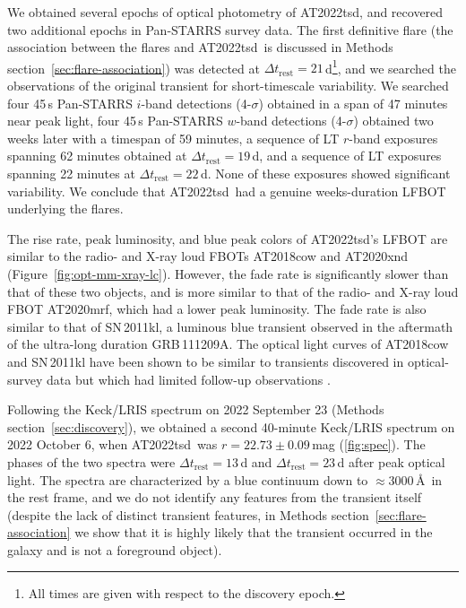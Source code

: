 \documentclass{nature_plusfigure}
\newcommand{\at}{AT2022tsd}
\begin{document}
\begin{methods}
We obtained several epochs of optical photometry of \at, and recovered two additional epochs in Pan-STARRS survey data.
The first definitive flare (the association between the flares and \at\ is discussed in Methods section~\ref{sec:flare-association}) was detected at $\Delta t_\mathrm{rest}=21$\,d\footnote{All times are given with respect to the discovery epoch.}, and we searched the observations of the original transient for short-timescale variability.
We searched four 45\,s Pan-STARRS $i$-band detections (4-$\sigma$) obtained in a span of 47 minutes near peak light,
four 45\,s Pan-STARRS $w$-band detections (4-$\sigma$) obtained two weeks later with a timespan of 59 minutes,
a sequence of LT $r$-band exposures spanning 62 minutes obtained at $\Delta t_\mathrm{rest}=19\,$d,
and a sequence of LT exposures spanning 22 minutes at $\Delta t_\mathrm{rest}=22$\,d.
None of these exposures showed significant variability.
We conclude that \at\ had a genuine weeks-duration LFBOT underlying the flares.

The rise rate, peak luminosity, and blue peak colors of \at's LFBOT are similar to the radio- and X-ray loud FBOTs AT2018cow and AT2020xnd (Figure~\ref{fig:opt-mm-xray-lc}). However, the fade rate is significantly slower than that of these two objects, and is more similar to that of the radio- and X-ray loud FBOT AT2020mrf\cite{Yao2022}, which had a lower peak luminosity. The fade rate is also similar to that of SN\,2011kl, a luminous blue transient observed in the aftermath of the ultra-long duration GRB\,111209A\cite{Greiner2015}.
The optical light curves of AT2018cow and SN\,2011kl have been shown to be similar to transients discovered in optical-survey data but which had limited follow-up observations \cite{Arcavi2016,Pursiainen2018,Drout2014}.

Following the Keck/LRIS spectrum on 2022 September 23 (Methods section~\ref{sec:discovery}), we obtained a second 40-minute Keck/LRIS spectrum on 2022 October 6, when \at\ was $r=22.73\pm0.09\,$mag (\ref{fig:spec}). 
The phases of the two spectra were $\Delta t_\mathrm{rest}=13\,$d and $\Delta t_\mathrm{rest}=23$\,d after peak optical light.
The spectra are characterized by a blue continuum down to $\approx3000\,$\AA\ in the rest frame, and we do not identify any features from the transient itself (despite the lack of distinct transient features, in Methods section~\ref{sec:flare-association} we show that it is highly likely that the transient occurred in the galaxy and is not a foreground object). 


\end{methods}
\end{document}
